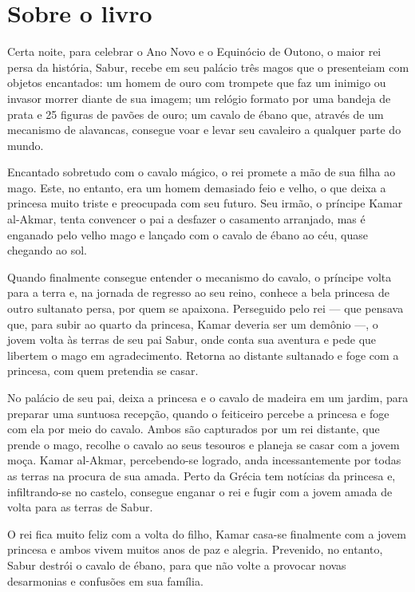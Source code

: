 \documentclass[11pt]{extarticle}
\begin{document}
\section{Sobre o livro}
Certa noite, para celebrar o Ano Novo e o Equinócio de Outono, o maior rei persa da história, Sabur, recebe em seu palácio três magos que o presenteiam com objetos encantados: um homem de ouro com trompete que faz um inimigo ou invasor morrer diante de sua imagem; um relógio formato por uma bandeja de prata e 25 figuras de pavões de ouro; um cavalo de ébano que, através de um mecanismo de alavancas, consegue voar e levar seu cavaleiro a qualquer parte do mundo.

Encantado sobretudo com o cavalo mágico, o rei promete a mão de sua filha ao mago. Este, no entanto, era um homem demasiado feio e velho, o que deixa a princesa muito triste e preocupada com seu futuro. Seu irmão, o príncipe Kamar al-Akmar, tenta convencer o pai a desfazer o casamento arranjado, mas é enganado pelo velho mago e lançado com o cavalo de ébano ao céu, quase chegando ao sol.

Quando finalmente consegue entender o mecanismo do cavalo, o príncipe volta para a terra e, na jornada de regresso ao seu reino, conhece a bela princesa de outro sultanato persa, por quem se apaixona. Perseguido pelo rei --- que pensava que, para subir ao quarto da princesa, Kamar deveria ser um demônio ---, o jovem volta às terras de seu pai Sabur, onde conta sua aventura e pede que libertem o mago em agradecimento. Retorna ao distante sultanado e foge com a princesa, com quem pretendia se casar.

No palácio de seu pai, deixa a princesa e o cavalo de madeira em um jardim, para preparar uma suntuosa recepção, quando o feiticeiro percebe a princesa e foge com ela por meio do cavalo. Ambos são capturados por um rei distante, que prende o mago, recolhe o cavalo ao seus tesouros e planeja se casar com a jovem moça. Kamar al-Akmar, percebendo-se logrado, anda incessantemente por todas as terras na procura de sua amada. Perto da Grécia tem notícias da princesa e, infiltrando-se no castelo, consegue enganar o rei e fugir com a jovem amada de volta para as terras de Sabur.

O rei fica muito feliz com a volta do filho, Kamar casa-se finalmente com a jovem princesa e ambos vivem muitos anos de paz e alegria. Prevenido, no entanto, Sabur destrói o cavalo de ébano, para que não volte a provocar novas desarmonias e confusões em sua família.

\reversemarginpar
\marginparwidth=5cm
\end{document}
